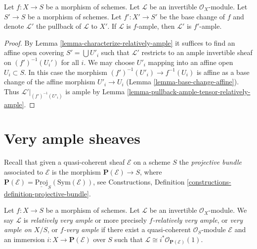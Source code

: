 \begin{lemma}
\label{lemma-ample-base-change}
Let $f : X \to S$ be a morphism of schemes.
Let $\mathcal{L}$ be an invertible $\mathcal{O}_X$-module.
Let $S' \to S$ be a morphism of schemes.
Let $f' : X' \to S'$ be the base change of $f$ and denote
$\mathcal{L}'$ the pullback of $\mathcal{L}$ to $X'$.
If $\mathcal{L}$ is $f$-ample, then $\mathcal{L}'$ is $f'$-ample.
\end{lemma}

\begin{proof}
By Lemma \ref{lemma-characterize-relatively-ample} it suffices
to find an affine open covering $S' = \bigcup U'_i$
such that $\mathcal{L}'$ restricts to an ample invertible
sheaf on $(f')^{-1}(U_i')$ for all $i$. We may choose $U'_i$
mapping into an affine open $U_i \subset S$. In this case the
morphism $(f')^{-1}(U'_i) \to f^{-1}(U_i)$ is affine as a base
change of the affine morphism $U'_i \to U_i$
(Lemma \ref{lemma-base-change-affine}). Thus
$\mathcal{L}'|_{(f')^{-1}(U'_i)}$ is ample by
Lemma \ref{lemma-pullback-ample-tensor-relatively-ample}.
\end{proof}










\section{Very ample sheaves}
\label{section-very-ample}

\noindent
Recall that given a quasi-coherent sheaf $\mathcal{E}$ on a scheme
$S$ the {\it projective bundle} associated to $\mathcal{E}$ is the morphism
$\mathbf{P}(\mathcal{E}) \to S$, where
$\mathbf{P}(\mathcal{E}) = \underline{\text{Proj}}_S(\text{Sym}(\mathcal{E}))$,
see
Constructions, Definition \ref{constructions-definition-projective-bundle}.

\begin{definition}
\label{definition-very-ample}
Let $f : X \to S$ be a morphism of schemes.
Let $\mathcal{L}$ be an invertible $\mathcal{O}_X$-module.
We say $\mathcal{L}$ is {\it relatively very ample} or more
precisely {\it $f$-relatively very ample}, or
{\it very ample on $X/S$}, or {\it $f$-very ample} if
there exist a quasi-coherent $\mathcal{O}_S$-module
$\mathcal{E}$ and an immersion $i : X \to \mathbf{P}(\mathcal{E})$
over $S$ such that
$\mathcal{L} \cong i^*\mathcal{O}_{\mathbf{P}(\mathcal{E})}(1)$.
\end{definition}



